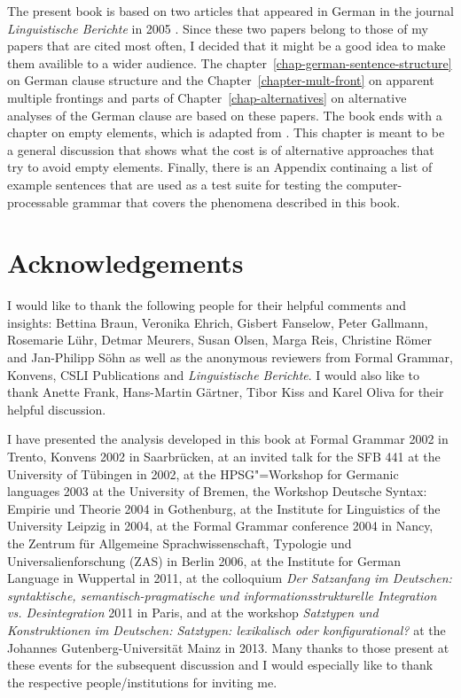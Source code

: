 The present book is based on two articles that appeared in German in the journal \emph{Linguistische
  Berichte} in 2005 \citep{Mueller2005c,Mueller2005d}. Since these two papers belong to those of my papers
that are cited most often, I decided that it might be a good idea to make them availible to a wider
audience. The chapter~\ref{chap-german-sentence-structure} on German clause structure and the
Chapter~\ref{chapter-mult-front} on apparent multiple frontings and parts of
Chapter~\ref{chap-alternatives} on alternative analyses of the German clause are based on these
papers.  
The book ends with a chapter on empty elements, which is adapted from . This
chapter is meant to be a general discussion that shows what the cost is of alternative approaches
that try to avoid empty elements. Finally, there is an Appendix continaing a list of example
sentences that are used as a test suite for testing the computer-processable grammar that covers the
phenomena described in this book.



\section*{Acknowledgements}

I would like to thank the following people for their helpful comments and insights:
Bettina Braun,
Veronika Ehrich,
Gisbert Fanselow,
Peter Gallmann,
Rosemarie Lühr,
Detmar Meurers,
Susan Olsen,
Marga Reis, 
Christine Römer and 
Jan-Philipp Söhn 
as well as the anonymous reviewers from Formal Grammar, Konvens, CSLI Publications and \emph{Linguistische Berichte}.
I would also like to thank Anette Frank, Hans-Martin Gärtner, Tibor Kiss and Karel Oliva for their helpful discussion.

I have presented the analysis developed in this book at Formal Grammar 2002 in Trento, Konvens
2002 in Saarbrücken, at an invited talk for the SFB 441 at the University of Tübingen in 2002, at
the HPSG"=Workshop for Germanic languages 2003 at the University of Bremen, 
%
the Workshop Deutsche Syntax: Empirie und Theorie 2004 in Gothenburg,
%
at the Institute for Linguistics of the University Leipzig in 2004,
%
at the Formal Grammar conference 2004 in Nancy,
the 	Zentrum für Allgemeine Sprachwissenschaft, Typologie und
Universalienforschung (ZAS) in Berlin 2006,
%
at the Institute for German Language in Wuppertal in 2011,
%
at the colloquium
\emph{Der Satzanfang im Deutschen: syntaktische, semantisch-​pragmatische und
  informationsstrukturelle Integration vs. Desintegration} 2011 in Paris,
%
and at the workshop \emph{Satztypen und Konstruktionen im Deutschen: Satztypen:
  lexikalisch oder konfigurational?} at the Johannes Gutenberg-​Universität Mainz in
2013.
%
Many thanks to those present at these events for the subsequent discussion and I would especially like to thank the respective people/institutions for inviting me. 

